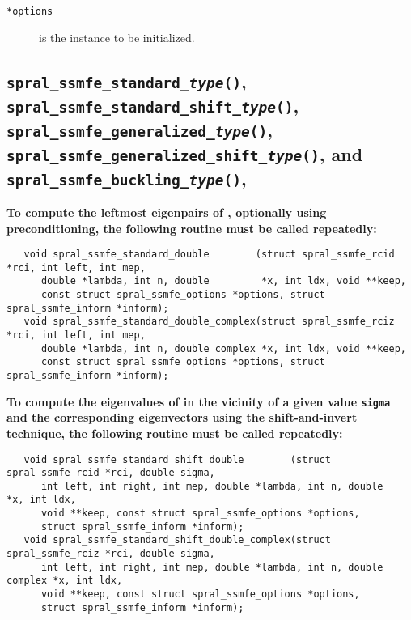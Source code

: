 \noindent
\begin{description}
   \item[\texttt{*options}] is the instance to be initialized.
\end{description}

\subsection{%
   \texttt{spral\_ssmfe\_standard\_\textit{type}()},
   \texttt{spral\_ssmfe\_standard\_shift\_\textit{type}()}, \\
   \texttt{spral\_ssmfe\_generalized\_\textit{type}()},
   \texttt{spral\_ssmfe\_generalized\_shift\_\textit{type}()}, and
   \texttt{spral\_ssmfe\_buckling\_\textit{type}()},
}

{\bf
To compute
the leftmost eigenpairs of ,
optionally using preconditioning,
the following routine must be called repeatedly:
}

\begin{verbatim}
   void spral_ssmfe_standard_double        (struct spral_ssmfe_rcid *rci, int left, int mep,
      double *lambda, int n, double         *x, int ldx, void **keep,
      const struct spral_ssmfe_options *options, struct spral_ssmfe_inform *inform);
   void spral_ssmfe_standard_double_complex(struct spral_ssmfe_rciz *rci, int left, int mep,
      double *lambda, int n, double complex *x, int ldx, void **keep,
      const struct spral_ssmfe_options *options, struct spral_ssmfe_inform *inform);
\end{verbatim}

\medskip
\noindent
{\bf
To compute the eigenvalues of  %
in the vicinity of 
a given value {\tt sigma}
and the corresponding eigenvectors using the shift-and-invert technique,
the following routine must be called repeatedly:
}
\begin{verbatim}
   void spral_ssmfe_standard_shift_double        (struct spral_ssmfe_rcid *rci, double sigma,
      int left, int right, int mep, double *lambda, int n, double         *x, int ldx,
      void **keep, const struct spral_ssmfe_options *options,
      struct spral_ssmfe_inform *inform);
   void spral_ssmfe_standard_shift_double_complex(struct spral_ssmfe_rciz *rci, double sigma,
      int left, int right, int mep, double *lambda, int n, double complex *x, int ldx,
      void **keep, const struct spral_ssmfe_options *options,
      struct spral_ssmfe_inform *inform);
\end{verbatim}

